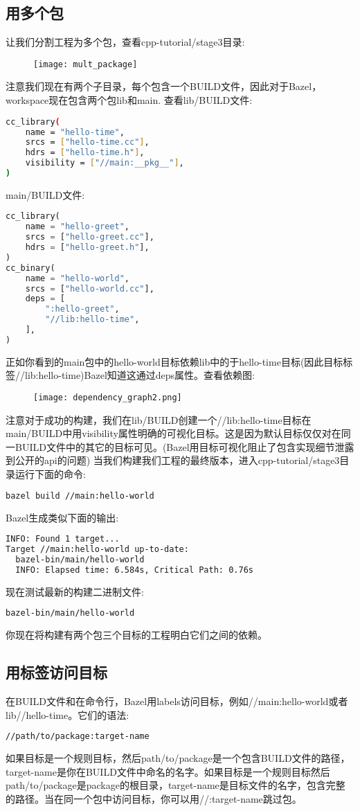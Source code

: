\subsection{用多个包}
让我们分割工程为多个包，查看cpp-tutorial/stage3目录:
\begin{center}
\begin{figure}[h]
	\texttt{[image: mult\_package]}
\end{figure}
\end{center}
注意我们现在有两个子目录，每个包含一个BUILD文件，因此对于Bazel，workspace现在包含两个包lib和main.
查看lib/BUILD文件:
\begin{lstlisting}[language=Bash]
cc_library(
    name = "hello-time",
    srcs = ["hello-time.cc"],
    hdrs = ["hello-time.h"],
    visibility = ["//main:__pkg__"],
)
\end{lstlisting}
main/BUILD文件:
\begin{lstlisting}[language=Python]
cc_library(
    name = "hello-greet",
    srcs = ["hello-greet.cc"],
    hdrs = ["hello-greet.h"],
)
cc_binary(
    name = "hello-world",
    srcs = ["hello-world.cc"],
    deps = [
        ":hello-greet",
        "//lib:hello-time",
    ],
)
\end{lstlisting}
正如你看到的main包中的hello-world目标依赖lib中的于hello-time目标(因此目标标签//lib:hello-time)Bazel知道这通过deps属性。查看依赖图:
\begin{figure}[h]
	\texttt{[image: dependency\_graph2.png]}
\end{figure}
注意对于成功的构建，我们在lib/BUILD创建一个//lib:hello-time目标在main/BUILD中用visibility属性明确的可视化目标。这是因为默认目标仅仅对在同一BUILD文件中的其它的目标可见。(Bazel用目标可视化阻止了包含实现细节泄露到公开的api的问题)
当我们构建我们工程的最终版本，进入cpp-tutorial/stage3目录运行下面的命令:
\begin{lstlisting}[language=Bash]
bazel build //main:hello-world
\end{lstlisting}
Bazel生成类似下面的输出:
\begin{lstlisting}[language=Bash]
INFO: Found 1 target...
Target //main:hello-world up-to-date:
  bazel-bin/main/hello-world
  INFO: Elapsed time: 6.584s, Critical Path: 0.76s
\end{lstlisting}
现在测试最新的构建二进制文件:
\begin{lstlisting}[language=Bash]
bazel-bin/main/hello-world
\end{lstlisting}
你现在将构建有两个包三个目标的工程明白它们之间的依赖。
\subsection{用标签访问目标}
在BUILD文件和在命令行，Bazel用labels访问目标，例如//main:hello-world或者lib//hello-time。它们的语法:
\begin{lstlisting}[language=Bash]
//path/to/package:target-name
\end{lstlisting}
如果目标是一个规则目标，然后path/to/package是一个包含BUILD文件的路径，target-name是你在BUILD文件中命名的名字。如果目标是一个规则目标然后path/to/package是package的根目录，target-name是目标文件的名字，包含完整的路径。当在同一个包中访问目标，你可以用//:target-name跳过包。
